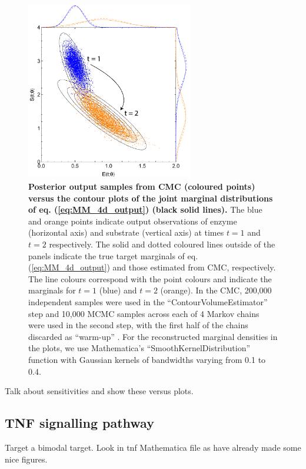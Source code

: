 \documentclass[10pt,letterpaper]{article}
\begin{document}
\begin{figure}[H]
	\centerline{\includegraphics[width=0.65\textwidth]{../figures/mm_4d_outputs.pdf}}
	\caption{\textbf{Posterior output samples from CMC (coloured points) versus the contour plots of the joint marginal distributions of eq. (\ref{eq:MM_4d_output}) (black solid lines).} The blue and orange points indicate output observations of enzyme (horizontal axis) and substrate (vertical axis) at times $t=1$ and $t=2$ respectively. The solid and dotted coloured lines outside of the panels indicate the true target marginals of eq. (\ref{eq:MM_4d_output}) and those estimated from CMC, respectively. The line colours correspond with the point colours and indicate the marginals for $t=1$ (blue) and $t=2$ (orange). In the CMC, 200,000 independent samples were used in the ``ContourVolumeEstimator'' step and 10,000 MCMC samples across each of 4 Markov chains were used in the second step, with the first half of the chains discarded as ``warm-up'' \cite{lambert2018Student}. For the reconstructed marginal densities in the plots, we use Mathematica's ``SmoothKernelDistribution'' function with Gaussian kernels \cite{mathematica} of bandwidths varying from 0.1 to 0.4.}
	\label{fig:mm_4d_outputs}
\end{figure}

Talk about sensitivities and show these versus plots.


\subsection{TNF signalling pathway}
Target a bimodal target. Look in tnf Mathematica file as have already made some nice figures.
\end{document}
